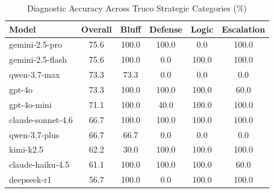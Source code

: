\begin{table}[ht]
\centering
\caption{Diagnostic Accuracy Across Truco Strategic Categories (\%)}
\label{tab:diagnostics_v3}
\begin{tabular}{@{}lccccc@{}}
\toprule
Model & Overall & Bluff & Defense & Logic & Escalation \\ 
\midrule
gemini-2.5-pro & 75.6 & 100.0 & 100.0 & 0.0 & 100.0 \\ 
gemini-2.5-flash & 75.6 & 100.0 & 0.0 & 100.0 & 100.0 \\ 
\midrule
qwen-3.7-max & 73.3 & 73.3 & 0.0 & 0.0 & 0.0 \\ 
gpt-4o & 73.3 & 100.0 & 100.0 & 100.0 & 60.0 \\ 
gpt-4o-mini & 71.1 & 100.0 & 40.0 & 100.0 & 100.0 \\ 
claude-sonnet-4.6 & 66.7 & 100.0 & 100.0 & 100.0 & 100.0 \\ 
\midrule
qwen-3.7-plus & 66.7 & 66.7 & 0.0 & 0.0 & 0.0 \\ 
kimi-k2.5 & 62.2 & 30.0 & 100.0 & 100.0 & 100.0 \\ 
claude-haiku-4.5 & 61.1 & 100.0 & 100.0 & 100.0 & 60.0 \\ 
deepseek-r1 & 56.7 & 100.0 & 0.0 & 100.0 & 100.0 \\ 
\bottomrule
\end{tabular}
\end{table}